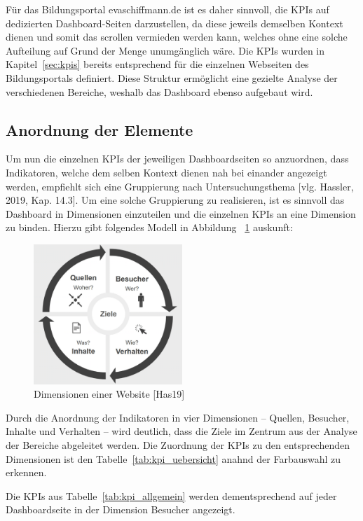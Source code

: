 Für das Bildungsportal evaschiffmann.de ist es daher sinnvoll, die KPIs auf dedizierten Dashboard-Seiten darzustellen, da diese jeweils demselben Kontext dienen und somit das scrollen vermieden werden kann, welches ohne eine solche Aufteilung auf Grund der Menge unumgänglich wäre. Die KPIs wurden in Kapitel~\ref{sec:kpis} bereits entsprechend für die einzelnen Webseiten des Bildungsportals definiert. Diese Struktur ermöglicht eine gezielte Analyse der verschiedenen Bereiche, weshalb das Dashboard ebenso aufgebaut wird.

\subsection{Anordnung der Elemente}
Um nun die einzelnen KPIs der jeweiligen Dashboardseiten so anzuordnen, dass Indikatoren, welche dem selben Kontext dienen nah bei einander angezeigt werden, empfiehlt sich eine Gruppierung nach Untersuchungsthema [vlg. Hassler, 2019, Kap. 14.3]. Um eine solche Gruppierung zu realisieren, ist es sinnvoll das Dashboard in Dimensionen einzuteilen und die einzelnen KPIs an eine Dimension zu binden. Hierzu gibt folgendes Modell in Abbildung ~\ref{fig:dimensionen} auskunft: 

\begin{figure}[h]
    \centering
    \includegraphics[width=0.5\textwidth]{images/dimensionen.png}%
    \caption{Dimensionen einer Website [Has19]}%
    \label{fig:dimensionen}%
\end{figure}

Durch die Anordnung der Indikatoren in vier Dimensionen – Quellen, Besucher, Inhalte und Verhalten – wird deutlich, dass die Ziele im Zentrum aus der Analyse der Bereiche abgeleitet werden. Die Zuordnung der KPIs zu den entsprechenden Dimensionen ist den Tabelle~\ref{tab:kpi_uebersicht} anahnd der Farbauswahl zu erkennen.

Die KPIs aus Tabelle~\ref{tab:kpi_allgemein} werden dementsprechend auf jeder Dashboardseite in der Dimension Besucher angezeigt.


